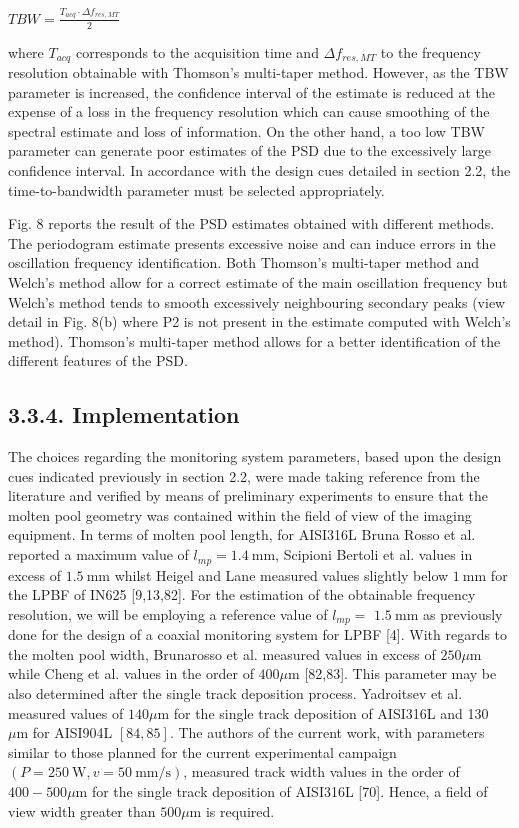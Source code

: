 \documentclass[10pt]{article}
\begin{document}
$T B W=\frac{T_{a c q} \cdot \Delta f_{r e s, M T}}{2}$

where $T_{a c q}$ corresponds to the acquisition time and $\Delta f_{r e s, M T}$ to the frequency resolution obtainable with Thomson's multi-taper method. However, as the TBW parameter is increased, the confidence interval of the estimate is reduced at the expense of a loss in the frequency resolution which can cause smoothing of the spectral estimate and loss of information. On the other hand, a too low TBW parameter can generate poor estimates of the PSD due to the excessively large confidence interval. In accordance with the design cues detailed in section 2.2, the time-to-bandwidth parameter must be selected appropriately.

Fig. 8 reports the result of the PSD estimates obtained with different methods. The periodogram estimate presents excessive noise and can induce errors in the oscillation frequency identification. Both Thomson's multi-taper method and Welch's method allow for a correct estimate of the main oscillation frequency but Welch's method tends to smooth excessively neighbouring secondary peaks (view detail in Fig. 8(b) where P2 is not present in the estimate computed with Welch's method). Thomson's multi-taper method allows for a better identification of the different features of the PSD.

\subsection*{3.3.4. Implementation}
The choices regarding the monitoring system parameters, based upon the design cues indicated previously in section 2.2, were made taking reference from the literature and verified by means of preliminary experiments to ensure that the molten pool geometry was contained within the field of view of the imaging equipment. In terms of molten pool length, for AISI316L Bruna Rosso et al. reported a maximum value of $l_{m p}=1.4 \mathrm{~mm}$, Scipioni Bertoli et al. values in excess of $1.5 \mathrm{~mm}$ whilst Heigel and Lane measured values slightly below $1 \mathrm{~mm}$ for the LPBF of IN625 [9,13,82]. For the estimation of the obtainable frequency resolution, we will be employing a reference value of $l_{m p}=$ $1.5 \mathrm{~mm}$ as previously done for the design of a coaxial monitoring system for LPBF [4]. With regards to the molten pool width, Brunarosso et al. measured values in excess of $250 \mu \mathrm{m}$ while Cheng et al. values in the order of $400 \mu \mathrm{m}$ [82,83]. This parameter may be also determined after the single track deposition process. Yadroitsev et al. measured values of $140 \mu \mathrm{m}$ for the single track deposition of AISI316L and 130 $\mu \mathrm{m}$ for AISI904L $[84,85]$. The authors of the current work, with parameters similar to those planned for the current experimental campaign $(P=250 \mathrm{~W}, v=50 \mathrm{~mm} / \mathrm{s})$, measured track width values in the order of $400-500 \mu \mathrm{m}$ for the single track deposition of AISI316L [70]. Hence, a field of view width greater than $500 \mu \mathrm{m}$ is required.
\end{document}
